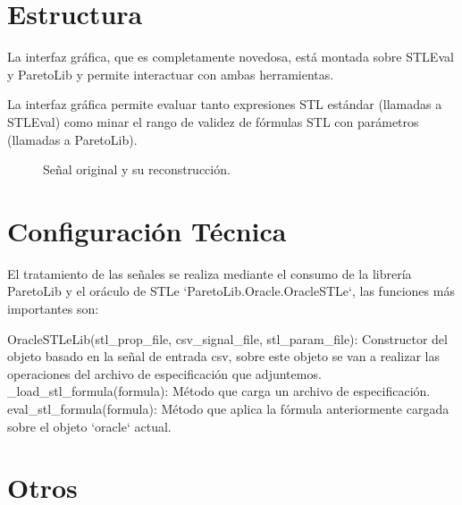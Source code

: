 
\section{Estructura}
\label{sec:estructura}
La interfaz gráfica, que es completamente novedosa, está montada sobre STLEval y ParetoLib y permite interactuar con ambas herramientas.

La interfaz gráfica permite evaluar tanto expresiones STL estándar (llamadas a STLEval) como minar el rango de validez de fórmulas STL con parámetros (llamadas a ParetoLib).

\begin{figure}
\centering
\caption{Señal original y su reconstrucción.}
\label{fig:senal}
\end{figure} 
 
\section{Configuración Técnica}
El tratamiento de las señales se realiza mediante el consumo de la librería ParetoLib y el oráculo de STLe `ParetoLib.Oracle.OracleSTLe`, las funciones más importantes son: 
 
OracleSTLeLib(stl\_prop\_file, csv\_signal\_file, stl\_param\_file): Constructor del objeto basado en la señal de entrada csv, sobre este objeto se van a realizar las operaciones del archivo de especificación que adjuntemos. 
\_load\_stl\_formula(formula): Método que carga un archivo de especificación. 
eval\_stl\_formula(formula): Método que aplica la fórmula anteriormente cargada sobre el objeto `oracle` actual.
 
 
 
 
 
\section{Otros}


